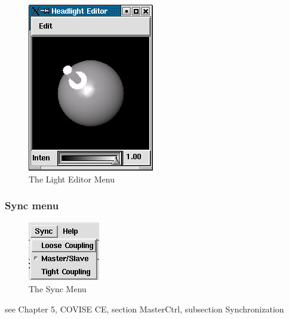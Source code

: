 \begin{itemize}
 \latexonly
 \begin{figure}[htp]
  \begin{center}
   \includegraphics[scale=0.7]{renderer/pict/image25}
   \caption{The Light Editor Menu}
	\label{fig71}
  \end{center}
 \end{figure}
 \endlatexonly

\end{itemize}
\clearpage

\subsubsection{Sync menu}

 \latexonly
 \begin{figure}[htp]
  \begin{center}
   \includegraphics[scale=0.7]{renderer/pict/image26}
   \caption{The Sync Menu}
	\label{fig72}
  \end{center}
 \end{figure}
 \endlatexonly
 
see Chapter 5, COVISE CE, section MasterCtrl, subsection Synchronization


